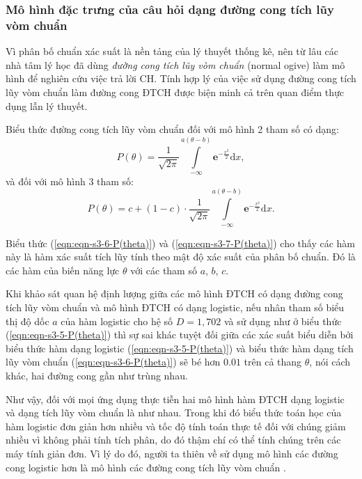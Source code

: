 \subsubsection{Mô hình đặc trưng của câu hỏi dạng đường cong tích lũy vòm chuẩn}
Vì phân bố chuẩn xác suất là nền tảng của lý thuyết thống kê, nên từ lâu các nhà tâm lý học đã dùng \textit{đường cong tích lũy vòm chuẩn} (normal ogive) làm mô hình để nghiên cứu việc trả lời CH. Tính hợp lý của việc sử dụng đường cong tích lũy vòm chuẩn làm đường cong ĐTCH được biện minh cả trên quan điểm thực dụng lẫn lý thuyết.\par
Biểu thức đường cong tích lũy vòm chuẩn đối với mô hình 2 tham số có dạng:
\begin{equation}\label{eqn:eqn-s3-6-P(theta)}
	P(\theta)=\frac{1}{\sqrt{2\pi}}\int\limits_{-\infty}^{a(\theta-b)}\mathbf{e}^{-\frac{x^2}{2}}\mathrm{d}x,
\end{equation}
và đối với mô hình 3 tham số:
\begin{equation}\label{eqn:eqn-s3-7-P(theta)}
	P(\theta)=c+(1-c)\cdot\frac{1}{\sqrt{2\pi}}\int\limits_{-\infty}^{a(\theta-b)}\mathbf{e}^{-\frac{x^2}{2}}\mathrm{d}x.
\end{equation}\par
Biểu thức (\ref{eqn:eqn-s3-6-P(theta)}) và (\ref{eqn:eqn-s3-7-P(theta)}) cho thấy các hàm này là hàm xác suất tích lũy tính theo mật độ xác suất của phân bố chuẩn. Đó là các hàm của biến năng lực $\theta$ với các tham số $a$, $b$, $c$.\par
Khi khảo sát quan hệ định lượng giữa các mô hình ĐTCH có dạng đường cong tích lũy vòm chuẩn và mô hình ĐTCH có dạng logistic, nếu nhân tham số biểu thị độ dốc $a$ của hàm logistic cho hệ số $D=1,702$ và sử dụng như ở biểu thức (\ref{eqn:eqn-s3-5-P(theta)}) thì sự sai khác tuyệt đối giữa các xác suất biểu diễn bởi biểu thức hàm dạng logistic (\ref{eqn:eqn-s3-5-P(theta)}) và biểu thức hàm dạng tích lũy vòm chuẩn (\ref{eqn:eqn-s3-6-P(theta)}) sẽ bé hơn $0.01$ trên cả thang $\theta$, nói cách khác, hai đường cong gần như trùng nhau.\par
Như vậy, đối với mọi ứng dụng thực tiễn hai mô hình hàm ĐTCH dạng logistic và dạng tích lũy vòm chuẩn là như nhau. Trong khi đó biểu thức toán học của hàm logistic đơn giản hơn nhiều và tốc độ tính toán thực tế đối với chúng giảm nhiều vì không phải tính tích phân, do đó thậm chí có thể tính chúng trên các máy tính giản đơn. Vì lý do đó, người ta thiên về sử dụng mô hình các đường cong logistic hơn là mô hình các đường cong tích lũy vòm chuẩn \cite{thiep2011do}.

